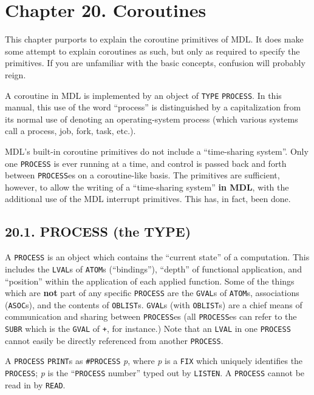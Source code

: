\documentclass[a4paper,]{article}
\begin{document}
\section{Chapter 20. Coroutines}\label{chapter-20.-coroutines}

This chapter purports to explain the coroutine primitives of MDL. It does make some attempt to explain coroutines as such,
but only as required to specify the primitives. If you are unfamiliar with the basic concepts, confusion will probably
reign.

A coroutine in MDL is implemented by an object of \texttt{TYPE} \texttt{PROCESS}. In this manual, this use of the word
``process'' is distinguished by a capitalization from its normal use of denoting an operating-system process (which various
systems call a process, job, fork, task, etc.).

MDL's built-in coroutine primitives do not include a ``time-sharing system''. Only one \texttt{PROCESS} is ever running at
a time, and control is passed back and forth between \texttt{PROCESS}es on a coroutine-like basis. The primitives are
sufficient, however, to allow the writing of a ``time-sharing system'' \textbf{in MDL}, with the additional use of the MDL
interrupt primitives. This has, in fact, been done.

\subsection{20.1. PROCESS (the TYPE)}\label{process-the-type}

A \texttt{PROCESS} is an object which contains the ``current state'' of a computation. This
includes the \texttt{LVAL}s of \texttt{ATOM}s (``bindings''), ``depth'' of functional application, and
``position'' within the application of each applied function. Some of the things which are \textbf{not} part of any
specific \texttt{PROCESS} are the \texttt{GVAL}s of \texttt{ATOM}s, associations
(\texttt{ASOC}s), and the contents of \texttt{OBLIST}s. \texttt{GVAL}s (with
\texttt{OBLIST}s) are a chief means of communication and sharing between \texttt{PROCESS}es (all \texttt{PROCESS}es can
refer to the \texttt{SUBR} which is the \texttt{GVAL} of \texttt{+}, for instance.) Note that an \texttt{LVAL} in one
\texttt{PROCESS} cannot easily be directly referenced from another \texttt{PROCESS}.

A \texttt{PROCESS} \texttt{PRINT}s as \texttt{\#PROCESS} \emph{p}, where \emph{p} is a \texttt{FIX} which uniquely
identifies the \texttt{PROCESS}; \emph{p} is the ``\texttt{PROCESS} number'' typed out by
\texttt{LISTEN}. A \texttt{PROCESS} cannot be read in by \texttt{READ}.
\end{document}
